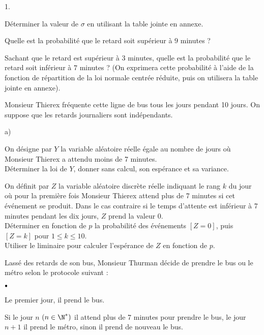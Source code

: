 \documentclass[11pt]{article}%
\begin{document}
\begin{noliste}{1.}
 \setlength{\itemsep}{4mm}
\item Déterminer la valeur de $\sigma $ en utilisant la table jointe en
annexe.

\item Quelle est la probabilité que le retard soit supérieur à $9
$ minutes ?

\item Sachant que le retard est supérieur à $3$ minutes, quelle est
la probabilité que le retard soit inférieur à $7$ minutes ? (On
exprimera cette probabilité à l'aide de la fonction de répartition de
la loi normale centrée réduite, puis on utilisera la
table jointe en annexe).

\item Monsieur Thierex fréquente cette ligne de bus tous les jours
pendant 10 jours. On suppose que les retards journaliers sont
indépendants.

\begin{noliste}{a)}
 \setlength{\itemsep}{2mm}
\item On désigne par $Y$ la variable aléatoire réelle égale
au nombre de jours où Monsieur Thierex a attendu moins de 7 minutes.\\
Déterminer la loi de $Y$, donner sans calcul, son espérance et sa
variance.

\item On définit par $Z$ la variable aléatoire discrète réelle
indiquant le rang $k$ du jour où pour la première fois Monsieur
Thierex attend plus de 7 minutes si cet événement se produit. Dans
le cas contraire si le temps d'attente est inférieur à 7 minutes
pendant les dix jours, $Z$ prend la valeur $0$.\\
Déterminer en fonction de $p$ la probabilité des événements $\left[ Z =
0\right] $, puis $\left[ Z = k\right] $ pour $1\leq k\leq 10$.\\
Utiliser le liminaire pour calculer l'espérance de $Z$ en fonction de
$p$.
\end{noliste}

\item Lassé des retards de son bus, Monsieur Thurman décide de
prendre le bus ou le métro selon le protocole suivant :

\begin{noliste}{$\scriptstyle \bullet$}
\item Le premier jour, il prend le bus.

\item Si le jour $n$ $\left( n\in \N^{\ast }\right) $ il attend plus
de 7 minutes pour prendre le bus, le jour $n + 1$ il prend le métro,
sinon
il prend de nouveau le bus.


\end{noliste}
\end{noliste}
\end{document}
